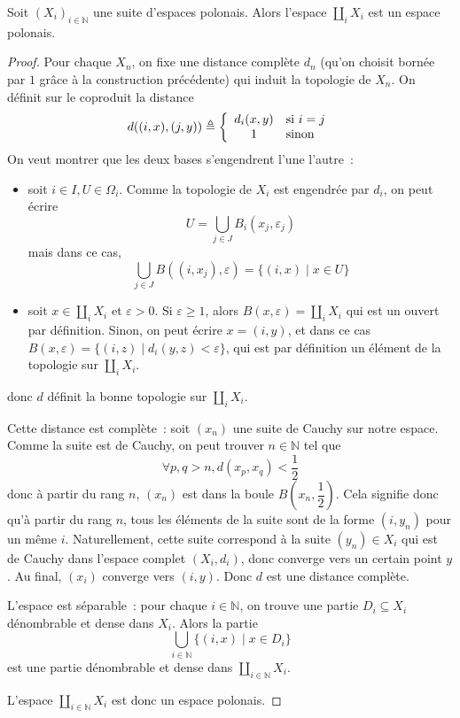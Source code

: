 \begin{proposition}
  Soit $(X_i)_{i\in \mathbb N}$ une suite d'espaces polonais. Alors l'espace
  $\coprod_i X_i$ est un espace polonais.
\end{proposition}

\begin{proof}
  Pour chaque $X_n$, on fixe une distance complète $d_n$ (qu'on choisit bornée
  par $1$ grâce à la construction précédente) qui induit la topologie de $X_n$.
  On définit sur le coproduit la distance
  \[d((i,x),(j,y)) \triangleq
  \left\{\begin{array}{cl}
  d_i(x,y) & \text{si } i = j\\
  1 & \text{sinon}
  \end{array}\right.\]
  On veut montrer que les deux bases s'engendrent l'une l'autre~:
  \begin{itemize}
  \item soit $i\in I, U \in \Omega_i$. Comme la topologie de $X_i$ est
    engendrée par $d_i$, on peut écrire
    \[U = \bigcup_{j \in J} B_i(x_j,\varepsilon_j)\]
    mais dans ce cas,
    \[\bigcup_{j \in J}B((i,x_j),\varepsilon) = \{(i,x)\mid x \in U\}\]
  \item soit $x\in \coprod_i X_i$ et $\varepsilon > 0$. Si
    $\varepsilon \geq 1$, alors $B(x,\varepsilon) = \coprod_i X_i$ qui est un
    ouvert par définition. Sinon, on peut écrire $x = (i,y)$, et dans ce cas
    $B(x,\varepsilon) = \{(i,z) \mid d_i(y,z) < \varepsilon\}$, qui est par
    définition un élément de la topologie sur $\coprod_i X_i$.
  \end{itemize}
  donc $d$ définit la bonne topologie sur $\coprod_i X_i$.

  Cette distance est complète~: soit $(x_n)$ une suite de Cauchy sur notre
  espace. Comme la suite est de Cauchy, on peut trouver $n\in\mathbb N$ tel que
  \[\forall p,q > n, d(x_p,x_q) < \frac{1}{2}\]
  donc à partir du rang $n$, $(x_n)$ est dans la boule $B(x_n,\dfrac{1}{2})$.
  Cela signifie donc qu'à partir du rang $n$, tous les éléments de la suite
  sont de la forme $(i,y_n)$ pour un même $i$. Naturellement, cette suite
  correspond à la suite $(y_n) \in X_i$ qui est de Cauchy dans l'espace complet
  $(X_i,d_i)$, donc converge vers un certain point $y$. Au final, $(x_i)$
  converge vers $(i,y)$. Donc $d$ est une distance complète.

  L'espace est séparable~: pour chaque $i\in \mathbb N$, on trouve une partie
  $D_i\subseteq X_i$ dénombrable et dense dans $X_i$. Alors la partie
  \[\bigcup_{i\in \mathbb N}\{(i,x)\mid x \in D_i\}\]
  est une partie dénombrable et dense dans $\coprod_{i\in \mathbb N} X_i$.

  L'espace $\displaystyle\coprod_{i\in \mathbb N} X_i$ est donc un espace
  polonais.
\end{proof}

